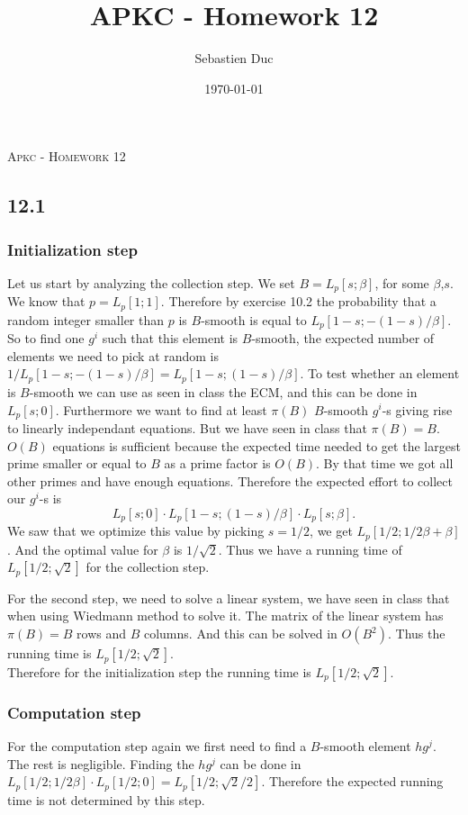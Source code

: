 \documentclass[12pt,a4paper]{article}
\title{APKC - Homework 12}
\author{Sebastien Duc}
\date{\today}
\newcommand {\Lfunc}[2]{L_p[#1;#2]}
\newcommand {\Ls}{\Lfunc{s}{\beta}}
\begin{document}
\begin{center}
    \Large{\textsc{Apkc - Homework 12}}
\end{center}
\subsection{12.1}
\subsubsection{Initialization step}
Let us start by analyzing the collection step.
We set $B=\Ls$, for some $\beta$,$s$. We know that $p = \Lfunc{1}{1}$. Therefore by exercise 10.2 the probability that a random integer smaller than $p$ is $B$-smooth 
is equal to $\Lfunc{1-s}{-(1-s)/\beta}$. So to find one $g^i$ such that this element is $B$-smooth, the expected number of elements we need to pick at random is
$1/\Lfunc{1-s}{-(1-s)/\beta} = \Lfunc{1-s}{(1-s)/\beta}$. To test whether an element is $B$-smooth we can use as seen in class the ECM, and this can be done in $\Lfunc{s}{0}$.
Furthermore we want to find at least $\pi(B)$ $B$-smooth $g^i$-s giving rise to linearly independant equations. But we have seen in class that $\pi(B) = B$.
$O(B)$ equations is sufficient because the expected time needed to get the largest prime smaller or equal to $B$ as a prime factor is $O(B)$. By that time
we got all other primes and have enough equations.
Therefore the expected effort to collect our $g^i$-s is 
\[
    \Lfunc{s}{0}\cdot\Lfunc{1-s}{(1-s)/\beta} \cdot \Lfunc{s}{\beta}.
\]
We saw that we optimize this value by picking $s = 1/2$, we get $\Lfunc{1/2}{1/2\beta + \beta}$.
And the optimal value for $\beta$ is $1/\sqrt{2}$. Thus we have a running time of $\Lfunc{1/2}{\sqrt{2}}$ for the collection step.

For the second step, we need to solve a linear system, we have seen in class that when using Wiedmann method to solve it. The matrix of the linear system has
$\pi(B)=B$ rows and $B$ columns. And this can be solved in $O(B^2)$. Thus the running time is $\Lfunc{1/2}{\sqrt{2}}$.
\\

Therefore for the initialization step the running time is $\Lfunc{1/2}{\sqrt{2}}$.

\subsubsection{Computation step}
For the computation step again we first need to find a $B$-smooth element $hg^j$. The rest is negligible.
Finding the $hg^j$ can be done in $\Lfunc{1/2}{1/2\beta}\cdot\Lfunc{1/2}{0} = \Lfunc{1/2}{\sqrt{2}/2}$.
Therefore the expected running time is not determined by this step.
\end{document}

